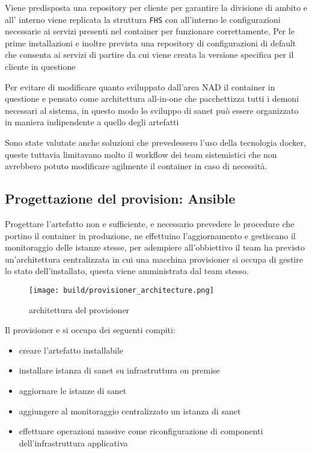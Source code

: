 Viene predisposta una repository per cliente per garantire la divisione di ambito e all' interno viene replicata la struttura \verb|FHS| con all'interno le configurazioni necessarie ai servizi presenti nel container per funzionare correttamente, Per le prime installazioni e inoltre prevista una repository di configurazioni di default che consenta ai servizi di partire da cui viene creata la versione specifica per il cliente in questione

Per evitare di modificare quanto sviluppato dall'area NAD il container in questione e pensato come architettura all-in-one che pacchettizza tutti i demoni necessari al sistema, in questo modo lo sviluppo di sanet può essere organizzato in maniera indipendente a quello degli artefatti

Sono state valutate anche soluzioni che prevedessero l'uso della tecnologia docker\cite{docker}, queste tuttavia limitavano molto il workflow dei team sistemistici che non avrebbero potuto modificare agilmente il container in caso di necessità.

\newpage
\subsection{Progettazione del provision: Ansible}

Progettare l'artefatto non e sufficiente, e necessario prevedere le procedure che portino il container in produzione, ne effettuino l'aggiornamento e gestiscano il monitoraggio delle istanze stesse, per adempiere all'obbiettivo il team ha previsto un'architettura centralizzata in cui una macchina provisioner si occupa di gestire lo stato dell'installato, questa viene amministrata dal team stesso.

\begin{figure}[H]
    \centering
    \texttt{[image: build/provisioner\_architecture.png]}
    \caption{architettura del provisioner}
    \label{fig:enter-label}
\end{figure}

Il provisioner e si occupa dei seguenti compiti:

\begin{itemize}
  \item{creare l'artefatto installabile}
  \item{installare istanza di sanet su infrastruttura on premise }
  \item{aggiornare le istanze di sanet}
  \item{aggiungere al monitoraggio centralizzato un istanza di sanet}
  \item{effettuare operazioni massive come riconfigurazione di componenti dell'infrastruttura applicativa}
\end{itemize}

